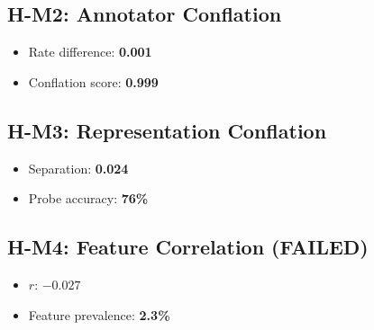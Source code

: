 \subsection{H-M2: Annotator Conflation}

\begin{itemize}
    \item Rate difference: \textbf{0.001}
    \item Conflation score: \textbf{0.999}
\end{itemize}

\subsection{H-M3: Representation Conflation}

\begin{itemize}
    \item Separation: \textbf{0.024}
    \item Probe accuracy: \textbf{76\%}
\end{itemize}

\subsection{H-M4: Feature Correlation (FAILED)}

\begin{itemize}
    \item $r$: \textbf{$-0.027$}
    \item Feature prevalence: \textbf{2.3\%}
\end{itemize}
